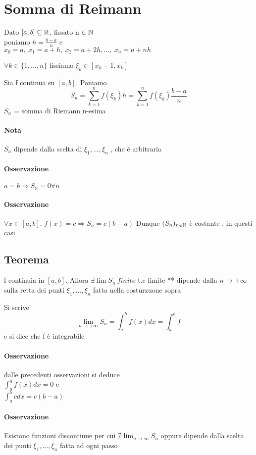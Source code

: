 \documentclass[a4paper]{article}
\begin{document}
	
\section{Somma di Reimann}
Dato $[a,b] \subseteq \mathbb{R}$, fissato n $\in \mathbb{N} $\\
poniamo $h = \frac{b-a}{n}$ e \\
$ x_0 = a, \ x_1 = a+h,\ x_2 = a + 2 h , \dots,\ x_n=a+nh $

$\forall k \in \{ 1, \dots,n\} $ fissiamo $ \xi_k \in [x_k-1,x_k] $

Sia f continua su $[a,b]$. Poniamo
$$
S_n = \sum_{k=1}^n f(\xi_k) h = \sum_{k=1}^n f (\xi_k) \frac{b-a}{n}
$$
$S_n$ = somma di Riemann n-esima
\paragraph{Nota} $S_n$ dipende dalla scelta di $\xi_1, \dots, \xi_n $ , che è arbitraria

\paragraph{Osservazione} $ a=b \Rightarrow S_n = 0 \forall n$
\paragraph{Osservazione} $ \forall x \in [a,b]$. $f(x) = c \Rightarrow S_n =  c (b-a) $
Dunque $ (S_n)_{n \in \mathbb{N}}$ è costante , in questi casi

\subsection{Teorema} f continuia in $[a,b]$. Allora $ \exists \lim S_n \ finito $ t.c limite ** dipende dalla $ n \to + \infty$ sulla retta dei punti $ \xi_1 , \dots , \xi_n$ fatta nella costurzuone sopra

Si scrive
$$
\lim_{n \to + \infty} S_n = \int_a^b f(x) dx = \int_a^b f
$$
e si dice che f è integrabile

\paragraph{Osservazione} dalle precedenti osservazioni si deduce \\ $ \int_a^a f(x) dx =0 $ e \\ $\int_a^b c dx = c(b-a)$

\paragraph{Osservazione} Esistono funzioni discontinue per cui $ \nexists \lim_{n \to \infty} S_n$ oppure dipende dalla scelta dei punti $ \xi_1 , \dots, \xi_n $ fatta ad ogni passo
\end{document}
